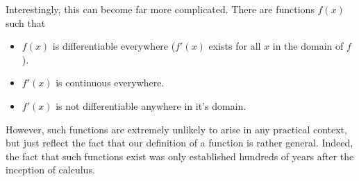 Interestingly, this can become far more complicated. There are functions $f(x)$ such that
\begin{itemize}
      \item $f(x)$ is differentiable everywhere ($f'(x)$ exists for all $x$ in the domain of $f$).
      \item $f'(x)$ is continuous everywhere.
      \item $f'(x)$ is not differentiable anywhere in it's domain.
\end{itemize}
However, such functions are extremely unlikely to arise in any practical context,
but just reflect the fact that our definition of a function is rather
general. Indeed, the fact that such functions exist was only established
hundreds of years after the inception of calculus.
